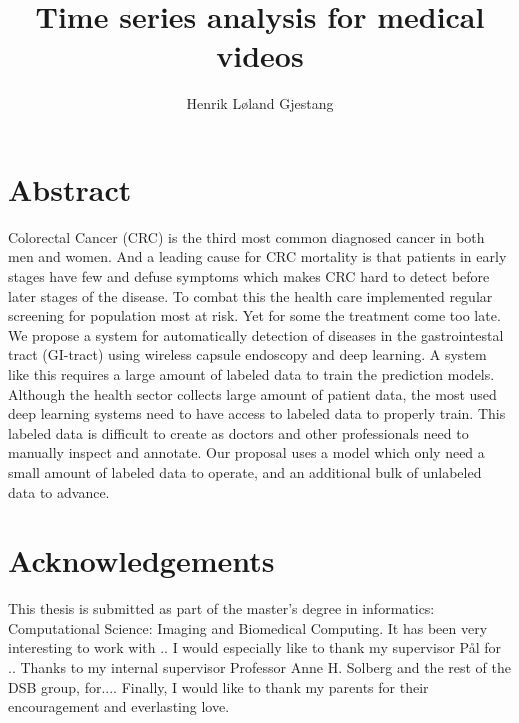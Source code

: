 \documentclass[english,a4paper,twoside]{report}
\title{Time series analysis for medical videos}
\author{Henrik Løland Gjestang}
\begin{document}

\duoforside[program={Computational Science},
  			dept={Department of Informatics},
  			option={Imaging and Biomedical Computing},
  			long]







\section*{Abstract}
Colorectal Cancer (CRC) is the third most common diagnosed cancer in both men and women. And a leading cause for CRC mortality is that patients in early stages have few and defuse symptoms which makes CRC hard to detect before later stages of the disease. To combat this the health care implemented regular screening for population most at risk. Yet for some the treatment come too late. 
We propose a system for automatically detection of diseases in the gastrointestal tract (GI-tract) using wireless capsule endoscopy and deep learning. A system like this requires a large amount of labeled data to train the prediction models. Although the health sector collects large amount of patient data, the most used deep learning systems need to have access to labeled data to properly train. This labeled data is difficult to create as doctors and other professionals need to manually inspect and annotate. Our proposal uses a model which only need a small amount of labeled data to operate, and an additional bulk of unlabeled data to advance. 

\cleardoublepage

\section*{Acknowledgements}
This thesis is submitted as part of the master's degree in informatics: Computational Science: Imaging and Biomedical Computing. It has been very interesting to work with ..
\medbreak \noindent
I would especially like to thank my supervisor Pål for ..
\medbreak \noindent
Thanks to my internal supervisor Professor Anne H. Solberg and the rest of the DSB group, for....
\medbreak \noindent
Finally, I would like to thank my parents for their encouragement and everlasting love.
\end{document}
